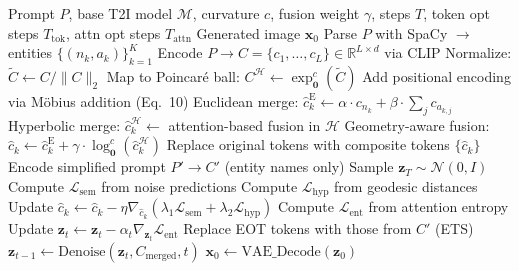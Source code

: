 \documentclass[sigconf,nonacm]{acmart}
\begin{document}
\begin{algorithm}[t]
\caption{GeoBind Inference}
\label{alg:geobind}
\begin{algorithmic}[1]
\Require Prompt $P$, base T2I model $\mathcal{M}$, curvature $c$, fusion weight $\gamma$, steps $T$, token opt steps $T_{\text{tok}}$, attn opt steps $T_{\text{attn}}$
\Ensure Generated image $\mathbf{x}_0$
\State Parse $P$ with SpaCy $\rightarrow$ entities $\{(n_k, a_k)\}_{k=1}^K$
\State Encode $P \rightarrow C = \{c_1, \ldots, c_L\} \in \mathbb{R}^{L \times d}$ via CLIP
\State Normalize: $\tilde{C} \leftarrow C / \|C\|_2$
\State Map to Poincar\'e ball: $C^{\mathcal{H}} \leftarrow \exp_\mathbf{0}^c(\tilde{C})$
\State Add positional encoding via M\"obius addition (Eq.~10)
    \State Euclidean merge: $\hat{c}_k^{\text{E}} \leftarrow \alpha \cdot c_{n_k} + \beta \cdot \sum_{j} c_{a_{k,j}}$ 
    \State Hyperbolic merge: $\hat{c}_k^{\mathcal{H}} \leftarrow$ attention-based fusion in $\mathcal{H}$ 
    \State Geometry-aware fusion: $\hat{c}_k \leftarrow \hat{c}_k^{\text{E}} + \gamma \cdot \log_\mathbf{0}^c(\hat{c}_k^{\mathcal{H}})$ 
\EndFor
\State Replace original tokens with composite tokens $\{\hat{c}_k\}$
\State Encode simplified prompt $P' \rightarrow C'$ (entity names only)
\State Sample $\mathbf{z}_T \sim \mathcal{N}(0, I)$
     
            \State Compute $\mathcal{L}_{\text{sem}}$ from noise predictions 
            \State Compute $\mathcal{L}_{\text{hyp}}$ from geodesic distances 
            \State Update $\hat{c}_k \leftarrow \hat{c}_k - \eta \nabla_{\hat{c}_k}(\lambda_1 \mathcal{L}_{\text{sem}} + \lambda_2 \mathcal{L}_{\text{hyp}})$ 
        \EndFor
    \EndIf
     
        \State Compute $\mathcal{L}_{\text{ent}}$ from attention entropy 
        \State Update $\mathbf{z}_t \leftarrow \mathbf{z}_t - \alpha_t \nabla_{\mathbf{z}_t} \mathcal{L}_{\text{ent}}$
    \EndIf
    \State Replace EOT tokens with those from $C'$ (ETS)
    \State $\mathbf{z}_{t-1} \leftarrow \text{Denoise}(\mathbf{z}_t, C_{\text{merged}}, t)$
\EndFor
\State $\mathbf{x}_0 \leftarrow \text{VAE\_Decode}(\mathbf{z}_0)$
\end{algorithmic}
\end{algorithm}
\end{document}
